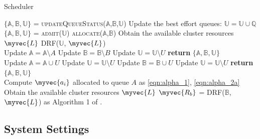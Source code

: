 \begin{algorithm}
\caption{Scheduler}
\label{algorithm1}
\begin{algorithmic}[1]
\State $\{\mathbb{A}, \mathbb{B}, \mathbb{U}\}$ = \textsc{updateQueueStatus}($\mathbb{A}$,$\mathbb{B}$,$\mathbb{U}$)
	\State Update the best effort queues: $\mathbb{U} = \mathbb{U} \cup \mathbb{Q}$
\EndIf
\State $\{\mathbb{A}, \mathbb{B}, \mathbb{U}\}$ = \textsc{admit}($\mathbb{U}$)
\State \textsc{allocate}($\mathbb{A}$,$\mathbb{B}$)
\State Obtain the available cluster resources $\myvec{L}$
\State DRF($\mathbb{U}$, $\myvec{L}$)
\EndProcedure
\\
	  Update $\mathbb{A} = \mathbb{A} \setminus A$
	\EndIf
\EndFor
{}
	 Update $\mathbb{B} = \mathbb{B} \setminus B$
	\EndIf	
\EndFor
{}
	 Update $\mathbb{U} = \mathbb{U} \setminus U$
	\EndIf
\EndFor
\State \textbf{return} $\{\mathbb{A} , \mathbb{B},\mathbb{U}  \}$	
\EndFunction
\\
			\State Update $\mathbb{A} = \mathbb{A} \cup U$
			\State Update $\mathbb{U} = \mathbb{U} \setminus U$
		\EndIf
	\Else
			\State Update $\mathbb{B} = \mathbb{B} \cup U$
			\State Update $\mathbb{U} = \mathbb{U} \setminus U$
		\EndIf
	\EndIf
\EndFor
\State \textbf{return} $\{\mathbb{A} , \mathbb{B},\mathbb{U}  \}$	
\EndFunction
\\
		\State Compute $\myvec{a_i}$ allocated to queue $A$ as \eqref{eqn:alpha_1}, \eqref{eqn:alpha_2a}
\EndFor
\State Obtain the available cluster resources $\myvec{L}$
\State $\myvec{R_b}$ = \textsc{DRF}($\mathbb{B}$,$\myvec{L}$) as Algorithm 1 of \cite{drf}.  
\EndFunction
\end{algorithmic}
\end{algorithm}

\subsection{System Settings}

